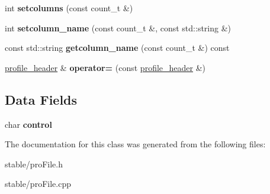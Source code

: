 \begin{DoxyCompactItemize}
\item 
\hypertarget{classprofile__header_a9e83afd1b3c7be15b90b49b7849b6768}{int {\bfseries setcolumns} (const count\-\_\-t \&)}\label{classprofile__header_a9e83afd1b3c7be15b90b49b7849b6768}

\item 
\hypertarget{classprofile__header_a7cadad0c1745947fb34071ca2ef1bdcd}{int {\bfseries setcolumn\-\_\-name} (const count\-\_\-t \&, const std\-::string \&)}\label{classprofile__header_a7cadad0c1745947fb34071ca2ef1bdcd}

\item 
\hypertarget{classprofile__header_a3ea72f2fd9bdcde0a4a5d1f1e7335e64}{const std\-::string {\bfseries getcolumn\-\_\-name} (const count\-\_\-t \&) const }\label{classprofile__header_a3ea72f2fd9bdcde0a4a5d1f1e7335e64}

\item 
\hypertarget{classprofile__header_a05787a0e90bb4f27d6b7b1cccecd20d3}{\hyperlink{classprofile__header}{profile\-\_\-header} \& {\bfseries operator=} (const \hyperlink{classprofile__header}{profile\-\_\-header} \&)}\label{classprofile__header_a05787a0e90bb4f27d6b7b1cccecd20d3}

\end{DoxyCompactItemize}
\subsection*{Data Fields}
\begin{DoxyCompactItemize}
\item 
\hypertarget{classprofile__header_a9bc6c1d4a979d36d060896cd2ee4d593}{char {\bfseries control}}\label{classprofile__header_a9bc6c1d4a979d36d060896cd2ee4d593}

\end{DoxyCompactItemize}


The documentation for this class was generated from the following files\-:\begin{DoxyCompactItemize}
\item 
stable/pro\-File.\-h\item 
stable/pro\-File.\-cpp\end{DoxyCompactItemize}
